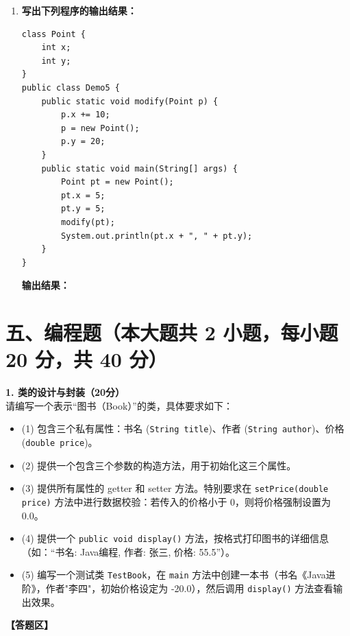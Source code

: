 \documentclass[a3paper, landscape, 11pt, twocolumn]{article}
\begin{document}
\begin{enumerate}[label=\arabic*., itemsep=1em]
	\item \textbf{写出下列程序的输出结果：}
	      \begin{lstlisting}[style=JavaExam]
class Point {
    int x;
    int y;
}
public class Demo5 {
    public static void modify(Point p) {
        p.x += 10;
        p = new Point();
        p.y = 20;
    }
    public static void main(String[] args) {
        Point pt = new Point();
        pt.x = 5;
        pt.y = 5;
        modify(pt);
        System.out.println(pt.x + ", " + pt.y);
    }
}
\end{lstlisting}
	      \textbf{输出结果：}\underline{\hspace{8cm}}
\end{enumerate}

\newpage
\section*{五、编程题（本大题共 2 小题，每小题 20 分，共 40 分）}

\textbf{1. 类的设计与封装（20分）}\\
请编写一个表示“图书（Book）”的类，具体要求如下：
\begin{itemize}
	\item (1) 包含三个私有属性：书名 (\texttt{String title})、作者 (\texttt{String author})、价格 (\texttt{double price})。
	\item (2) 提供一个包含三个参数的构造方法，用于初始化这三个属性。
	\item (3) 提供所有属性的 getter 和 setter 方法。特别要求在 \texttt{setPrice(double price)} 方法中进行数据校验：若传入的价格小于 0，则将价格强制设置为 0.0。
	\item (4) 提供一个 \texttt{public void display()} 方法，按格式打印图书的详细信息（如：“书名: Java编程, 作者: 张三, 价格: 55.5”）。
	\item (5) 编写一个测试类 \texttt{TestBook}，在 \texttt{main} 方法中创建一本书（书名《Java进阶》，作者"李四"，初始价格设定为 -20.0），然后调用 \texttt{display()} 方法查看输出效果。
\end{itemize}
\vspace{1em}
\textbf{【答题区】}
\vspace{12cm}
\end{document}
